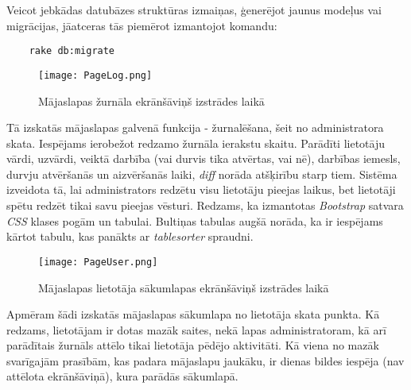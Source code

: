 Veicot jebkādas datubāzes struktūras izmaiņas, ģenerējot jaunus modeļus vai migrācijas, jāatceras tās piemērot izmantojot komandu:
\begin{lstlisting}
	rake db:migrate
\end{lstlisting}

\begin{figure}[H]%
	\centering
	\captionsetup{justification=centering}
	\texttt{[image: PageLog.png]}
	\caption{Mājaslapas žurnāla ekrānšāviņš izstrādes laikā}
	\label{fig:PageLog}
\end{figure}
Tā izskatās mājaslapas galvenā funkcija - žurnalēšana, šeit no administratora skata. Iespējams ierobežot redzamo žurnāla ierakstu skaitu. Parādīti lietotāju vārdi, uzvārdi, veiktā darbība (vai durvis tika atvērtas, vai nē), darbības iemesls, durvju atvēršanās un aizvēršanās laiki, \textit{diff} norāda atšķirību starp tiem. Sistēma izveidota tā, lai administrators redzētu visu lietotāju pieejas laikus, bet lietotāji spētu redzēt tikai savu pieejas vēsturi. Redzams, ka izmantotas \textit{Bootstrap} satvara \textit{CSS} klases pogām un tabulai. Bultiņas tabulas augšā norāda, ka ir iespējams kārtot tabulu, kas panākts ar \textit{tablesorter} spraudni.

\begin{figure}[H]%
	\centering
	\captionsetup{justification=centering}
	\texttt{[image: PageUser.png]}
	\caption{Mājaslapas lietotāja sākumlapas ekrānšāviņš izstrādes laikā}
	\label{fig:PageUser}
\end{figure}
Apmēram šādi izskatās mājaslapas sākumlapa no lietotāja skata punkta. Kā redzams, lietotājam ir dotas mazāk saites, nekā lapas administratoram, kā arī parādītais žurnāls attēlo tikai lietotāja pēdējo aktivitāti.
Kā viena no mazāk svarīgajām prasībām, kas padara mājaslapu jaukāku, ir dienas bildes iespēja (nav attēlota ekrānšāviņā), kura parādās sākumlapā.

